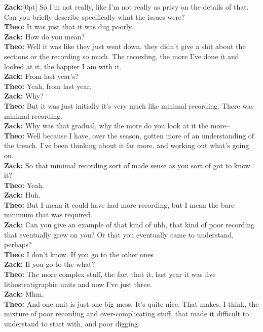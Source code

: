 \documentclass[
]{article}
\newcommand{\paragraphnumber}[1]{\marginnote{\color{lightgray}\tiny{#1}}[0pt]}
\begin{document}
\textbf{Zack:}\paragraphnumber{[71]} So I'm not really, like I'm not
really as privy on the details of that. Can you briefly describe
specifically what the issues were?\\
\textbf{Theo:} It was just that it was dug poorly.\\
\textbf{Zack:} How do you mean?\\
\textbf{Theo:} Well it was like they just went down, they didn't give a
shit about the sections or the recording so much. The recording, the
more I've done it and looked at it, the happier I am with it.\\
\textbf{Zack:} From last year's?\\
\textbf{Theo:} Yeah, from last year.\\
\textbf{Zack:} Why?\\
\textbf{Theo:} But it was just initially it's very much like minimal
recording. There was minimal recording.\\
\textbf{Zack:} Why was that gradual, why the more do you look at it the
more--\\
\textbf{Theo:} Well because I have, over the season, gotten more of an
understanding of the trench. I've been thinking about it far more, and
working out what's going on.\\
\textbf{Zack:} So that minimal recording sort of made sense as you sort
of got to know it?\\
\textbf{Theo:} Yeah.\\
\textbf{Zack:} Huh.\\
\textbf{Theo:} But I mean it could have had more recording, but I mean
the bare minimum that was required.\\
\textbf{Zack:} Can you give an example of that kind of uhh, that kind of
poor recording that eventually grew on you? Or that you eventually came
to understand, perhaps?\\
\textbf{Theo:} I don't know. If you go to the other ones\\
\textbf{Zack:} If you go to the what?\\
\textbf{Theo:} The more complex stuff, the fact that it, last year it
was five lithostratigraphic units and now I've just three.\\
\textbf{Zack:} Mhm.\\
\textbf{Theo:} And one unit is just one big mess. It's quite nice. That
makes, I think, the mixture of poor recording and over-complicating
stuff, that made it difficult to understand to start with, and poor
digging.\\
\end{document}
